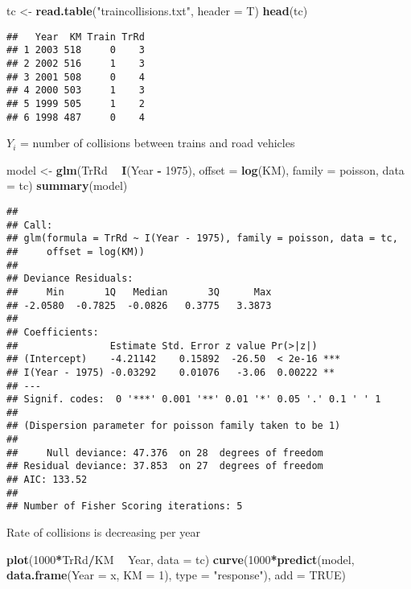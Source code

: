 \documentclass[]{article}
\newenvironment{Shaded}{\begin{snugshade}}{\end{snugshade}}
\newcommand{\DataTypeTok}[1]{\textcolor[rgb]{0.13,0.29,0.53}{#1}}
\newcommand{\DecValTok}[1]{\textcolor[rgb]{0.00,0.00,0.81}{#1}}
\newcommand{\KeywordTok}[1]{\textcolor[rgb]{0.13,0.29,0.53}{\textbf{#1}}}
\newcommand{\NormalTok}[1]{#1}
\newcommand{\OperatorTok}[1]{\textcolor[rgb]{0.81,0.36,0.00}{\textbf{#1}}}
\newcommand{\OtherTok}[1]{\textcolor[rgb]{0.56,0.35,0.01}{#1}}
\newcommand{\StringTok}[1]{\textcolor[rgb]{0.31,0.60,0.02}{#1}}
\begin{document}
\begin{Shaded}
\begin{Highlighting}[]
\NormalTok{tc <-}\StringTok{ }\KeywordTok{read.table}\NormalTok{(}\StringTok{"traincollisions.txt"}\NormalTok{, }\DataTypeTok{header =}\NormalTok{ T)}
\KeywordTok{head}\NormalTok{(tc)}
\end{Highlighting}
\end{Shaded}

\begin{verbatim}
##   Year  KM Train TrRd
## 1 2003 518     0    3
## 2 2002 516     1    3
## 3 2001 508     0    4
## 4 2000 503     1    3
## 5 1999 505     1    2
## 6 1998 487     0    4
\end{verbatim}

\(Y_i\) = number of collisions between trains and road vehicles

\begin{Shaded}
\begin{Highlighting}[]
\NormalTok{model <-}\StringTok{ }\KeywordTok{glm}\NormalTok{(TrRd }\OperatorTok{~}\StringTok{ }\KeywordTok{I}\NormalTok{(Year }\OperatorTok{-}\StringTok{ }\DecValTok{1975}\NormalTok{), }\DataTypeTok{offset =} \KeywordTok{log}\NormalTok{(KM), }\DataTypeTok{family =}\NormalTok{ poisson, }\DataTypeTok{data =}\NormalTok{ tc)}
\KeywordTok{summary}\NormalTok{(model)}
\end{Highlighting}
\end{Shaded}

\begin{verbatim}
## 
## Call:
## glm(formula = TrRd ~ I(Year - 1975), family = poisson, data = tc, 
##     offset = log(KM))
## 
## Deviance Residuals: 
##     Min       1Q   Median       3Q      Max  
## -2.0580  -0.7825  -0.0826   0.3775   3.3873  
## 
## Coefficients:
##                Estimate Std. Error z value Pr(>|z|)    
## (Intercept)    -4.21142    0.15892  -26.50  < 2e-16 ***
## I(Year - 1975) -0.03292    0.01076   -3.06  0.00222 ** 
## ---
## Signif. codes:  0 '***' 0.001 '**' 0.01 '*' 0.05 '.' 0.1 ' ' 1
## 
## (Dispersion parameter for poisson family taken to be 1)
## 
##     Null deviance: 47.376  on 28  degrees of freedom
## Residual deviance: 37.853  on 27  degrees of freedom
## AIC: 133.52
## 
## Number of Fisher Scoring iterations: 5
\end{verbatim}

Rate of collisions is decreasing per year

\begin{Shaded}
\begin{Highlighting}[]
\KeywordTok{plot}\NormalTok{(}\DecValTok{1000}\OperatorTok{*}\NormalTok{TrRd}\OperatorTok{/}\NormalTok{KM }\OperatorTok{~}\StringTok{ }\NormalTok{Year, }\DataTypeTok{data =}\NormalTok{ tc)}
\KeywordTok{curve}\NormalTok{(}\DecValTok{1000}\OperatorTok{*}\KeywordTok{predict}\NormalTok{(model, }\KeywordTok{data.frame}\NormalTok{(}\DataTypeTok{Year =}\NormalTok{ x, }\DataTypeTok{KM =} \DecValTok{1}\NormalTok{), }\DataTypeTok{type =} \StringTok{"response"}\NormalTok{), }\DataTypeTok{add =} \OtherTok{TRUE}\NormalTok{)}
\end{Highlighting}
\end{Shaded}
\end{document}
